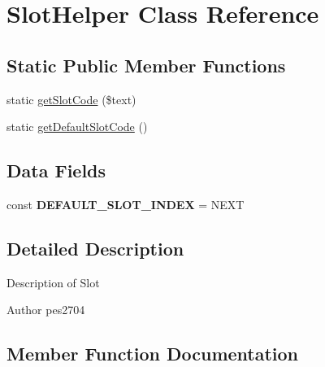 \hypertarget{class_pes_1_1_document_1_1_slot_helper}{}\section{Slot\+Helper Class Reference}
\label{class_pes_1_1_document_1_1_slot_helper}
\subsection*{Static Public Member Functions}
\begin{DoxyCompactItemize}
\item 
static \mbox{\hyperlink{class_pes_1_1_document_1_1_slot_helper_a6405a07adfaf197e36dd6fa9730d410d}{get\+Slot\+Code}} (\$text)
\item 
static \mbox{\hyperlink{class_pes_1_1_document_1_1_slot_helper_a571a1ef43bb3a949d9f6fe8447625e4b}{get\+Default\+Slot\+Code}} ()
\end{DoxyCompactItemize}
\subsection*{Data Fields}
\begin{DoxyCompactItemize}
\item 
\mbox{\label{class_pes_1_1_document_1_1_slot_helper_a017308f0fca1f052b43e74e1f2de9654}} 
const {\bfseries D\+E\+F\+A\+U\+L\+T\+\_\+\+S\+L\+O\+T\+\_\+\+I\+N\+D\+EX} = \textquotesingle{}N\+E\+XT\textquotesingle{}
\end{DoxyCompactItemize}


\subsection{Detailed Description}
Description of Slot

\begin{DoxyAuthor}{Author}
pes2704 
\end{DoxyAuthor}


\subsection{Member Function Documentation}
\mbox{\label{class_pes_1_1_document_1_1_slot_helper_a571a1ef43bb3a949d9f6fe8447625e4b}} 
